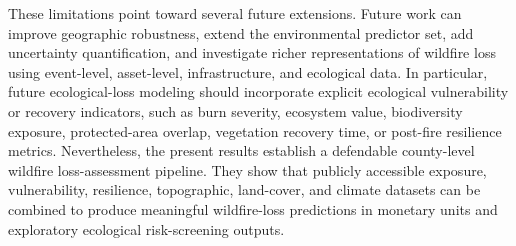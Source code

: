 These limitations point toward several future extensions. Future work can improve geographic robustness, extend the environmental predictor set, add uncertainty quantification, and investigate richer representations of wildfire loss using event-level, asset-level, infrastructure, and ecological data. In particular, future ecological-loss modeling should incorporate explicit ecological vulnerability or recovery indicators, such as burn severity, ecosystem value, biodiversity exposure, protected-area overlap, vegetation recovery time, or post-fire resilience metrics. Nevertheless, the present results establish a defendable county-level wildfire loss-assessment pipeline. They show that publicly accessible exposure, vulnerability, resilience, topographic, land-cover, and climate datasets can be combined to produce meaningful wildfire-loss predictions in monetary units and exploratory ecological risk-screening outputs.
